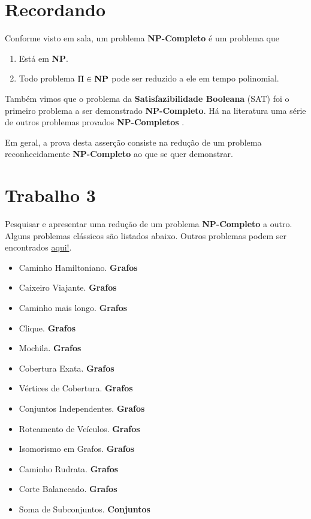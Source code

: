\documentclass[12pt, a4paper]{article}
\begin{document}


\tableofcontents
\pagebreak

\listoftables
\pagebreak

\section{Recordando}

Conforme visto em sala, um problema \textbf{NP-Completo} é um problema que

\begin{enumerate}
  \item Está em \textbf{NP}.
  \item Todo problema $\Pi \in \text{\textbf{NP}}$ pode ser reduzido a ele em tempo polinomial.
\end{enumerate}

Também vimos que o problema da \textbf{Satisfazibilidade Booleana} (SAT) foi o primeiro problema a ser demonstrado \textbf{NP-Completo}. Há na literatura uma série de outros problemas provados \textbf{NP-Completos} \cite{sipser06}.

Em geral, a prova desta asserção consiste na redução de um problema reconhecidamente \textbf{NP-Completo} ao que se quer demonstrar.

\section{Trabalho 3}

Pesquisar e apresentar uma redução de um problema \textbf{NP-Completo} a outro. Alguns problemas clássicos são listados abaixo. Outros problemas podem ser encontrados \href{http://en.wikipedia.org/wiki/List_of_NP-complete_problems}{aqui!}.

\begin{itemize}
  \item Caminho Hamiltoniano. \cite{sipser06} {\color{red}\textbf{Grafos}}
  \item Caixeiro Viajante. {\color{red}\textbf{Grafos}}
  \item Caminho mais longo. {\color{red}\textbf{Grafos}}
  \item Clique. \cite{sipser06} {\color{red}\textbf{Grafos}}
  \item Mochila. {\color{red}\textbf{Grafos}}
  \item Cobertura Exata. {\color{red}\textbf{Grafos}}
  \item Vértices de Cobertura. \cite{sipser06} {\color{red}\textbf{Grafos}}
  \item Conjuntos Independentes. {\color{red}\textbf{Grafos}}
  \item Roteamento de Veículos. {\color{red}\textbf{Grafos}}
  \item Isomorismo em Grafos. {\color{red}\textbf{Grafos}}
  \item Caminho Rudrata. {\color{red}\textbf{Grafos}}
  \item Corte Balanceado. {\color{red}\textbf{Grafos}}
  \item Soma de Subconjuntos. \cite{sipser06} {\color{blue}\textbf{Conjuntos}}
\end{itemize}
\end{document}
